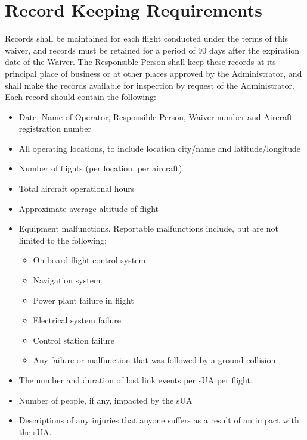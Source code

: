 \documentclass[
]{book}
\providecommand{\tightlist}{%
  \setlength{\itemsep}{0pt}\setlength{\parskip}{0pt}}
\begin{document}
\section{Record Keeping Requirements}\label{s39u88-rk}

Records shall be maintained for each flight conducted under the terms of this waiver, and records must be retained for a period of 90 days after the expiration date of the Waiver. The Responsible Person shall keep these records at its principal place of business or at other places approved by the Administrator, and shall make the records available for inspection by request of the Administrator. Each record should contain the following:

\begin{itemize}
\item
  Date, Name of Operator, Responsible Person, Waiver number and Aircraft registration number
\item
  All operating locations, to include location city/name and latitude/longitude
\item
  Number of flights (per location, per aircraft)
\item
  Total aircraft operational hours
\item
  Approximate average altitude of flight
\item
  Equipment malfunctions. Reportable malfunctions include, but are not limited to the following:

  \begin{itemize}
  \tightlist
  \item
    On-board flight control system
  \item
    Navigation system
  \item
    Power plant failure in flight
  \item
    Electrical system failure
  \item
    Control station failure
  \item
    Any failure or malfunction that was followed by a ground collision
  \end{itemize}
\item
  The number and duration of lost link events per sUA per flight.
\item
  Number of people, if any, impacted by the sUA
\item
  Descriptions of any injuries that anyone suffers as a result of an impact with the sUA.
\end{itemize}
\end{document}
